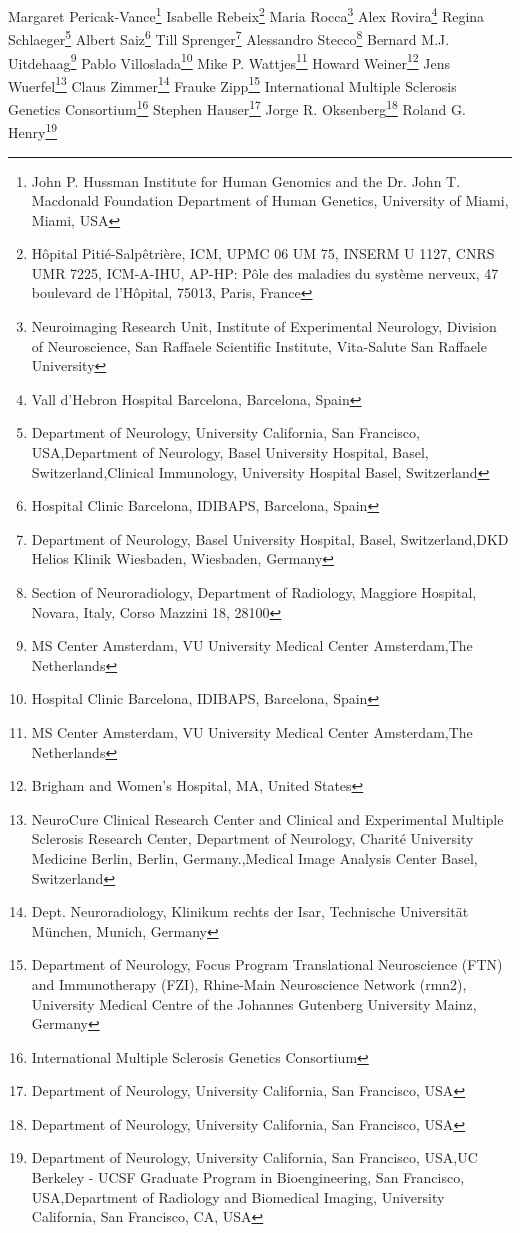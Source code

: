 Margaret Pericak-Vance\footnote[24]{John P. Hussman Institute for Human Genomics and the Dr. John T. Macdonald Foundation Department of Human Genetics, University of Miami, Miami, USA}
Isabelle Rebeix\footnote[17]{Hôpital Pitié-Salpêtrière, ICM, UPMC 06 UM 75, INSERM U 1127, CNRS UMR 7225, ICM-A-IHU, AP-HP: Pôle des maladies du système nerveux, 47 boulevard de l'Hôpital, 75013, Paris, France}
Maria Rocca\footnote[15]{Neuroimaging Research Unit, Institute of Experimental Neurology, Division of Neuroscience, San Raffaele Scientific Institute, Vita-Salute San Raffaele University}
Alex Rovira\footnote[10]{Vall d’Hebron Hospital Barcelona, Barcelona, Spain}
Regina Schlaeger\footnote[1,6,8]{Department of Neurology, University California, San Francisco,  USA,Department of Neurology, Basel University Hospital, Basel, Switzerland,Clinical Immunology, University Hospital Basel, Switzerland}
Albert Saiz\footnote[23]{Hospital Clinic Barcelona, IDIBAPS, Barcelona, Spain}
Till Sprenger\footnote[6,26]{Department of Neurology, Basel University Hospital, Basel, Switzerland,DKD Helios Klinik Wiesbaden, Wiesbaden, Germany}
Alessandro Stecco\footnote[27]{Section of Neuroradiology, Department of Radiology, Maggiore Hospital, Novara, Italy, Corso Mazzini 18, 28100}
Bernard M.J. Uitdehaag\footnote[28]{MS Center Amsterdam, VU University Medical Center Amsterdam,The Netherlands}
Pablo Villoslada\footnote[23]{Hospital Clinic Barcelona, IDIBAPS, Barcelona, Spain}
Mike P. Wattjes\footnote[28]{MS Center Amsterdam, VU University Medical Center Amsterdam,The Netherlands}
Howard Weiner\footnote[7]{Brigham and Women's Hospital, MA, United States}
Jens Wuerfel\footnote[3,29]{NeuroCure Clinical Research Center and Clinical and Experimental Multiple Sclerosis Research Center, Department of Neurology, Charité University Medicine Berlin, Berlin, Germany.,Medical Image Analysis Center Basel, Switzerland}
Claus Zimmer\footnote[30]{Dept. Neuroradiology, Klinikum rechts der Isar, Technische Universität München, Munich, Germany}
Frauke Zipp\footnote[16]{Department of Neurology, Focus Program Translational Neuroscience (FTN) and Immunotherapy (FZI), Rhine-Main Neuroscience Network (rmn2), University Medical Centre of the Johannes Gutenberg University Mainz, Germany}
International Multiple Sclerosis Genetics Consortium\footnote[31]{International Multiple Sclerosis Genetics Consortium}
Stephen Hauser\footnote[1]{Department of Neurology, University California, San Francisco,  USA}
Jorge R. Oksenberg\footnote[1]{Department of Neurology, University California, San Francisco,  USA}
Roland G. Henry\footnote[1,2,11]{Department of Neurology, University California, San Francisco,  USA,UC Berkeley - UCSF Graduate Program in Bioengineering, San Francisco, USA,Department of Radiology and Biomedical Imaging, University California, San Francisco, CA, USA}

